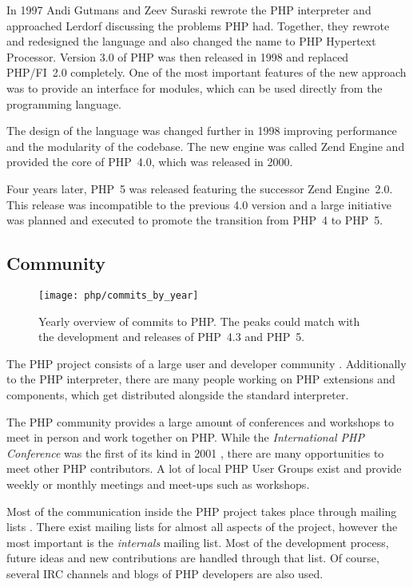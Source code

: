 In 1997 Andi Gutmans and Zeev Suraski rewrote the PHP interpreter and
approached Lerdorf discussing the problems PHP had. Together, they rewrote and
redesigned the language and also changed the name to PHP Hypertext Processor.
Version 3.0 of PHP was then released in 1998 and replaced PHP/FI~2.0
completely. One of the most important features of the new approach was to
provide an interface for modules, which can be used directly from the
programming language.

The design of the language was changed further in 1998 improving performance
and the modularity of the codebase. The new engine was called Zend Engine and
provided the core of PHP~4.0, which was released in 2000.

Four years later, PHP~5 was released featuring the successor Zend Engine~2.0.
This release was incompatible to the previous 4.0 version and a large
initiative was planned and executed to promote the transition from PHP~4 to
PHP~5.


\subsection{Community} %

\begin{figure}[htbp]
  \centering
  \texttt{[image: php/commits\_by\_year]}
  \caption[Commits by Year, PHP]
  {Yearly overview of commits to PHP. The peaks could match with the
    development and releases of PHP~4.3 and PHP~5.}
  \label{fig:php:cby}
\end{figure}

The PHP project consists of a large user and developer community
\cite{Magnusson2010}. Additionally to the PHP interpreter, there are many
people working on PHP extensions and components, which get distributed
alongside the standard interpreter.

The PHP community provides a large amount of conferences and workshops to meet
in person and work together on PHP. While the \emph{International PHP
Conference} was the first of its kind in 2001 \cite{PHPConferences}, there are
many opportunities to meet other PHP contributors. A lot of local PHP User
Groups exist and provide weekly or monthly meetings and meet-ups such as
workshops.

Most of the communication inside the PHP project takes place through mailing
lists \cite{Magnusson2010}. There exist mailing lists for almost all aspects of
the project, however the most important is the \emph{internals} mailing list.
Most of the development process, future ideas and new contributions are handled
through that list. Of course, several \ac{IRC} channels and blogs of PHP
developers are also used.

